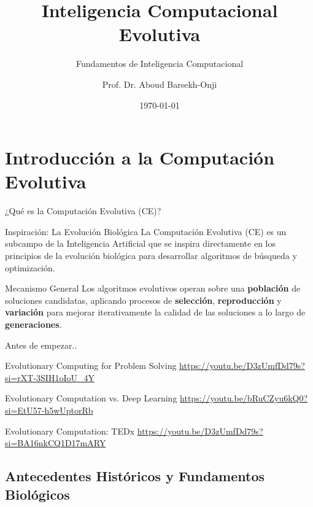 \documentclass[aspectratio=169,xcolor=dvipsnames]{beamer}
\title{Inteligencia Computacional Evolutiva}
\subtitle{Fundamentos de Inteligencia Computacional}
\author{Prof. Dr. Aboud Barsekh-Onji}
\institute
{
    Facultad de Ingeniería \\
    Universidad Anáhuac México %
}
\date{\today} %
\begin{document}
\begin{frame}
    \titlepage
\end{frame}

\section{Introducción a la Computación Evolutiva}

\begin{frame}{¿Qué es la Computación Evolutiva (CE)?}
    \begin{block}{Inspiración: La Evolución Biológica}
    La Computación Evolutiva (CE) es un subcampo de la Inteligencia Artificial que se inspira directamente en los principios de la evolución biológica para desarrollar algoritmos de búsqueda y optimización.
    \end{block}
    
    \begin{alertblock}{Mecanismo General}
    Los algoritmos evolutivos operan sobre una \textbf{población} de soluciones candidatas, aplicando procesos de \textbf{selección}, \textbf{reproducción} y \textbf{variación} para mejorar iterativamente la calidad de las soluciones a lo largo de \textbf{generaciones}.
    \end{alertblock}
\end{frame}


\begin{frame}{Antes de empezar..}
    \begin{block}{Evolutionary Computing for Problem Solving}
        \url{https://youtu.be/D3zUmfDd79s?si=rXT-3SIH1oIoU_4Y}
    \end{block}
        \begin{block}{Evolutionary Computation vs. Deep Learning}
        \url{https://youtu.be/bRuCZyu6kQ0?si=EtU57-h5wUptorRb}
    \end{block}
        \begin{block}{Evolutionary Computation: TEDx}
        \url{https://youtu.be/D3zUmfDd79s?si=BA16nkCQ1D17mARY}
    \end{block}
\end{frame}
\subsection{Antecedentes Históricos y Fundamentos Biológicos}
\end{document}
